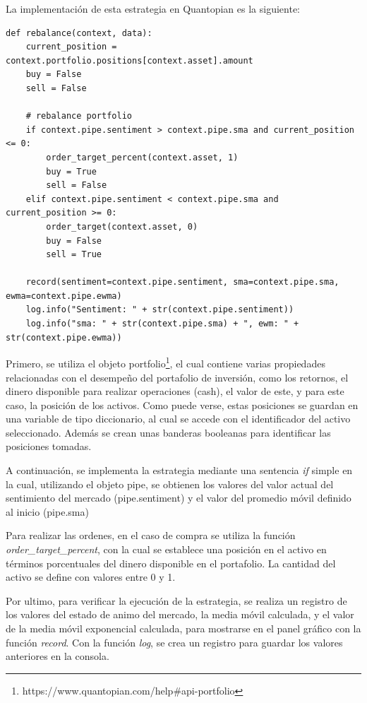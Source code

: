 \documentclass[a4paper, 11pt, twocolumn]{article}
\begin{document}
La implementación de esta estrategia en Quantopian es la siguiente:

\begin{lstlisting}
def rebalance(context, data):
    current_position = context.portfolio.positions[context.asset].amount
    buy = False
    sell = False
        
    # rebalance portfolio
    if context.pipe.sentiment > context.pipe.sma and current_position <= 0:
        order_target_percent(context.asset, 1)
        buy = True
        sell = False
    elif context.pipe.sentiment < context.pipe.sma and current_position >= 0:
        order_target(context.asset, 0)
        buy = False
        sell = True
        
    record(sentiment=context.pipe.sentiment, sma=context.pipe.sma, ewma=context.pipe.ewma)
    log.info("Sentiment: " + str(context.pipe.sentiment))
    log.info("sma: " + str(context.pipe.sma) + ", ewm: " + str(context.pipe.ewma))
\end{lstlisting}

Primero, se utiliza el objeto portfolio\footnote{https://www.quantopian.com/help\#api-portfolio}, el cual contiene varias propiedades relacionadas con el desempeño del portafolio de inversión, como los retornos, el dinero disponible para realizar operaciones (cash), el valor de este, y para este caso, la posición de los activos. Como puede verse, estas posiciones se guardan en una variable de tipo diccionario, al cual se accede con el identificador del activo seleccionado. Además se crean unas banderas booleanas para identificar las posiciones tomadas.

A continuación, se implementa la estrategia mediante una sentencia \textit{if} simple en la cual, utilizando el objeto pipe, se obtienen los valores del valor actual del sentimiento del mercado (pipe.sentiment) y el valor del promedio móvil definido al inicio (pipe.sma)

Para realizar las ordenes, en el caso de compra se utiliza la función \textit{order\_target\_percent}, con la cual se establece una posición en el activo en términos porcentuales del dinero disponible en el portafolio. La cantidad del activo se define con valores entre 0 y 1.

Por ultimo, para verificar la ejecución de la estrategia, se realiza un registro de los valores del estado de animo del mercado, la media móvil calculada, y el valor de la media móvil exponencial calculada, para mostrarse en el panel gráfico con la función \textit{record}. Con la función \textit{log}, se crea un registro para guardar los valores anteriores en la consola.
\end{document}
